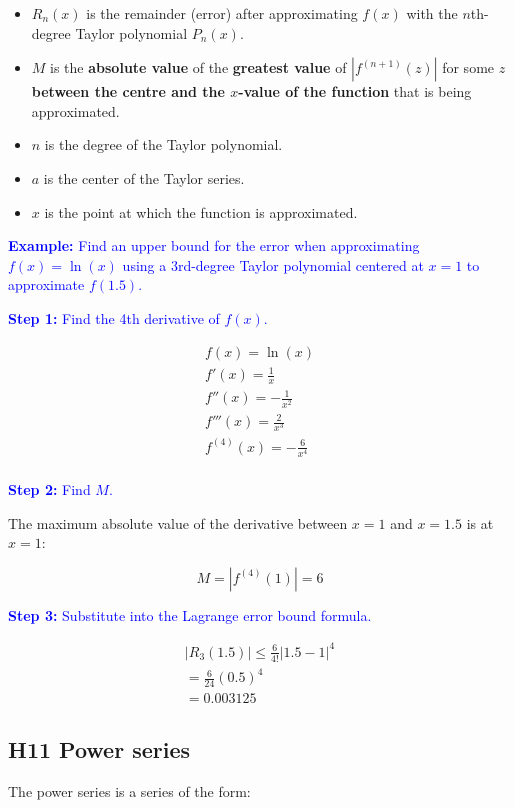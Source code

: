 \documentclass[letterpaper, 12pt]{article}
\newcommand{\example}[1]{\textcolor{blue}{\textbf{Example:} #1}}
\newcommand{\step}[2]{\textcolor{blue}{\textbf{Step #1:} #2}}
\begin{document}
\begin{itemize}
    \item $R_n(x)$ is the remainder (error) after approximating $f(x)$ with the $n$th-degree Taylor polynomial $P_n(x)$.
    \item $M$ is the \textbf{absolute value} of the \textbf{greatest value} of $|f^{(n+1)}(z)|$ for some $z$ \textbf{between the centre and the $x$-value of the function} that is being approximated.
    \item $n$ is the degree of the Taylor polynomial.
    \item $a$ is the center of the Taylor series.
    \item $x$ is the point at which the function is approximated.
\end{itemize}

\example{Find an upper bound for the error when approximating $f(x) = \ln(x)$ using a 3rd-degree Taylor polynomial centered at $x = 1$ to approximate $f(1.5)$.}

\step{1}{Find the 4th derivative of $f(x)$.}

\begin{gather*}
f(x) = \ln(x) \\
f'(x) = \frac{1}{x} \\
f''(x) = -\frac{1}{x^2} \\
f'''(x) = \frac{2}{x^3} \\
f^{(4)}(x) = -\frac{6}{x^4} \\
\end{gather*}

\step{2}{ Find $M$.}

The maximum absolute value of the derivative between $x = 1$ and $x = 1.5$ is at $x = 1$:

$$M = \left| f^{(4)}(1) \right| = 6$$

\step{3}{Substitute into the Lagrange error bound formula.}

\begin{gather*}
|R_3(1.5)| \leq \frac{6}{4!} |1.5 - 1|^4 \\
= \frac{6}{24} (0.5)^4 \\
= \boxed{0.003125}
\end{gather*}

\subsection*{H11 Power series}

The power series is a series of the form:
\end{document}
